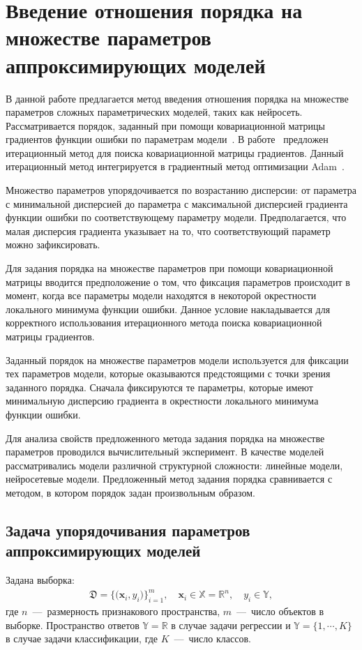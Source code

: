 \newpage

\section{Введение отношения порядка на множестве параметров аппроксимирующих моделей}
В данной работе предлагается метод введения отношения порядка на множестве параметров сложных параметрических моделей, таких как нейросеть. Рассматривается порядок, заданный при помощи ковариационной матрицы градиентов функции ошибки по параметрам модели~\cite{Mandt2017}. В работе~\cite{Chunyan2016} предложен итерационный метод для поиска ковариационной матрицы градиентов. Данный итерационный метод интегрируется в градиентный метод оптимизации Adam~\cite{Kingma2014}.

Множество параметров упорядочивается по возрастанию дисперсии: от параметра с минимальной дисперсией до параметра с максимальной дисперсией градиента функции ошибки по соответствующему параметру модели. Предполагается, что малая дисперсия градиента указывает на то, что соответствующий параметр можно зафиксировать.

Для задания порядка на множестве параметров при помощи ковариационной матрицы вводится предположение о том, что фиксация параметров происходит в момент, когда все параметры модели находятся в некоторой окрестности локального минимума функции ошибки. Данное условие накладывается для корректного использования итерационного метода поиска ковариационной матрицы градиентов.

Заданный порядок на множестве параметров модели используется для фиксации тех параметров модели, которые оказываются предстоящими с точки зрения заданного порядка. Сначала фиксируются те параметры, которые имеют минимальную дисперсию градиента в окрестности локального минимума функции ошибки.

Для анализа свойств предложенного метода задания порядка на множестве параметров проводился вычислительный эксперимент. В качестве моделей рассматривались модели различной структурной сложности: линейные модели, нейросетевые модели. Предложенный метод задания порядка сравнивается с методом, в котором порядок задан произвольным образом.
\subsection{Задача упорядочивания параметров аппроксимирующих моделей}
Задана выборка:
\[
\label{eq:st:1}
\begin{aligned}
\mathfrak{D} = \bigr\{\bigr(\textbf{x}_i, y_i\bigr)\bigr\}_{i=1}^{m}, \quad \textbf{x}_{i} \in \mathbb{X} = \mathbb{R}^{n}, \quad y_i \in \mathbb{Y},
\end{aligned}
\]
где $n$~---~размерность признакового пространства, $m$~---~число объектов в выборке. Пространство ответов $\mathbb{Y} = \mathbb{R}$ в случае задачи регрессии и  $\mathbb{Y} = \{1,\cdots, K\}$ в случае задачи классификации, где $K$~---~число классов.

